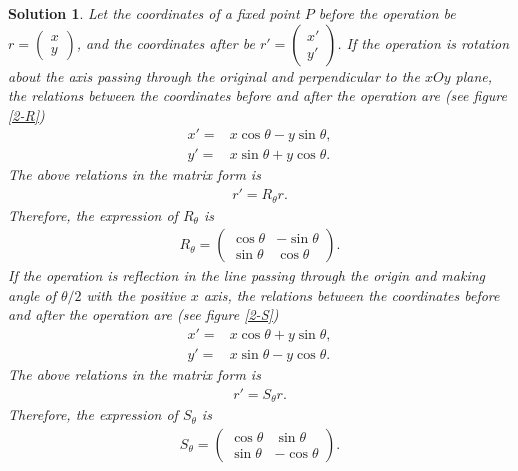 \documentclass[UTF8,10pt,a4paper]{article}
\theoremstyle{Problem}
\theoremstyle{Solution}
\newtheorem*{sol}{Solution}
\begin{document}
\begin{sol}
    Let the coordinates of a fixed point $P$ before the operation be $r=\left(\begin{smallmatrix}
        x\\
        y
    \end{smallmatrix}\right)$, and the coordinates after be $r'=\left(\begin{smallmatrix}
        x'\\
        y'
    \end{smallmatrix}\right)$. If the operation is rotation about the axis passing through the original and perpendicular to the $xOy$ plane, the relations between the coordinates before and after the operation are (see figure \ref{2-R})
    \begin{align}
        x'=&x\cos\theta-y\sin\theta,\\
        y'=&x\sin\theta+y\cos\theta.
    \end{align}
    The above relations in the matrix form is
    \begin{align}
        r'=R_{\theta}r.
    \end{align}
    Therefore, the expression of $R_{\theta}$ is
    \begin{align}
        R_{\theta}=\left(\begin{matrix}
            \cos\theta&-\sin\theta\\
            \sin\theta&\cos\theta
        \end{matrix}\right).
    \end{align}
    If the operation is reflection in the line passing through the origin and making angle of $\theta/2$ with the positive $x$ axis, the relations between the coordinates before and after the operation are (see figure \ref{2-S})
    \begin{align}
        x'=&x\cos\theta+y\sin\theta,\\
        y'=&x\sin\theta-y\cos\theta.
    \end{align}
    The above relations in the matrix form is
    \begin{align}
        r'=S_{\theta}r.
    \end{align}
    Therefore, the expression of $S_{\theta}$ is
    \begin{align}
        S_{\theta}=\left(\begin{matrix}
            \cos\theta&\sin\theta\\
            \sin\theta&-\cos\theta
        \end{matrix}\right).

\end{align}
\end{sol}
\end{document}

